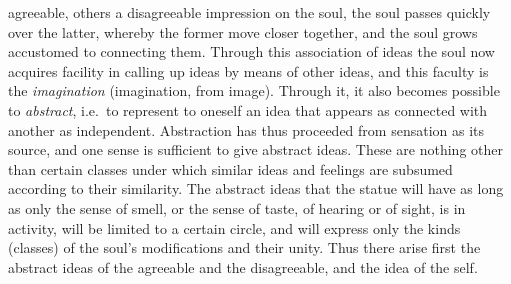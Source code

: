 agreeable, others a disagreeable impression on the soul, the soul
passes quickly over the latter, whereby the former move closer
together, and the soul grows accustomed to connecting them. Through
this association of ideas the soul now acquires facility in calling up
ideas by means of other ideas, and this faculty is the
\emph{imagination} (imagination, from image). Through it, it also
becomes possible to \emph{abstract}, i.e.\ to represent to oneself an
idea that appears as connected with another as independent. Abstraction
has thus proceeded from sensation as its source, and one sense
is sufficient to give abstract ideas. These are nothing other than
certain classes under which similar ideas and feelings are subsumed
according to their similarity. The abstract ideas that the statue will
have as long as only the sense of smell, or the sense of taste, of
hearing or of sight, is in activity, will be limited to a certain
circle, and will express only the kinds (classes) of the soul's
modifications and their unity. Thus there arise first the abstract
ideas of the agreeable and the disagreeable, and the idea of the self.

